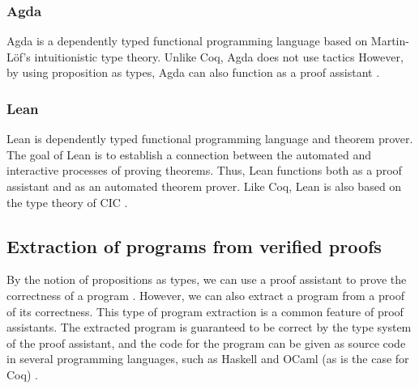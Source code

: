 \subsubsection{Agda}
\label{sssec:agda}

Agda is a dependently typed functional programming language based on Martin-Löf's
intuitionistic type theory. Unlike Coq, Agda does not use tactics
However, by using proposition as types, Agda can also function as a proof assistant
\cite{agdatut}.

\subsubsection{Lean}
\label{sssec:lean}

Lean is dependently typed functional programming language and theorem prover.
The goal of Lean is to establish a connection between the automated and interactive processes of proving theorems.
Thus, Lean functions both as a proof assistant and as an automated theorem prover.
Like Coq, Lean is also based on the type theory of CIC
\cite{lean}.

\subsection{Extraction of programs from verified proofs}
\label{ssec:extraction_of_programs_from_verified_proofs}

By the notion of propositions as types, we can use a proof assistant to
prove the correctness of a program \cite[Preface]{bpierce}. However, we can also extract a program from
a proof of its correctness. This type of program extraction is a common feature of proof assistants.
The extracted program is guaranteed to be correct by the type system of the proof assistant,
and the code for the program can be given as source code
in several programming languages, such as Haskell and OCaml (as is the case for Coq) \cite{cintro}.
